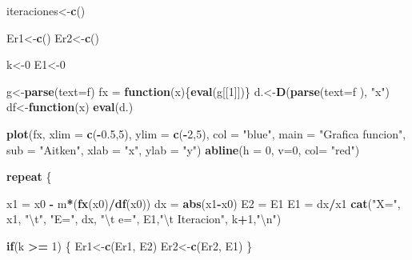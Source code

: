 \documentclass[]{article}
\newenvironment{Shaded}{\begin{snugshade}}{\end{snugshade}}
\newcommand{\CharTok}[1]{\textcolor[rgb]{0.31,0.60,0.02}{#1}}
\newcommand{\ControlFlowTok}[1]{\textcolor[rgb]{0.13,0.29,0.53}{\textbf{#1}}}
\newcommand{\DataTypeTok}[1]{\textcolor[rgb]{0.13,0.29,0.53}{#1}}
\newcommand{\DecValTok}[1]{\textcolor[rgb]{0.00,0.00,0.81}{#1}}
\newcommand{\FloatTok}[1]{\textcolor[rgb]{0.00,0.00,0.81}{#1}}
\newcommand{\KeywordTok}[1]{\textcolor[rgb]{0.13,0.29,0.53}{\textbf{#1}}}
\newcommand{\NormalTok}[1]{#1}
\newcommand{\OperatorTok}[1]{\textcolor[rgb]{0.81,0.36,0.00}{\textbf{#1}}}
\newcommand{\StringTok}[1]{\textcolor[rgb]{0.31,0.60,0.02}{#1}}
\begin{document}
\begin{Shaded}
\begin{Highlighting}[]
\NormalTok{  iteraciones<-}\KeywordTok{c}\NormalTok{()}
  
\NormalTok{  Er1<-}\KeywordTok{c}\NormalTok{()}
\NormalTok{  Er2<-}\KeywordTok{c}\NormalTok{()}
  
\NormalTok{  k<-}\DecValTok{0}
\NormalTok{  E1<-}\DecValTok{0}
  
\NormalTok{  g<-}\KeywordTok{parse}\NormalTok{(}\DataTypeTok{text=}\NormalTok{f)}
\NormalTok{  fx =}\StringTok{ }\ControlFlowTok{function}\NormalTok{(x)\{}\KeywordTok{eval}\NormalTok{(g[[}\DecValTok{1}\NormalTok{]])\}}
\NormalTok{  d.<-}\KeywordTok{D}\NormalTok{(}\KeywordTok{parse}\NormalTok{(}\DataTypeTok{text=}\NormalTok{f ), }\StringTok{"x"}\NormalTok{)}
\NormalTok{  df<-}\ControlFlowTok{function}\NormalTok{(x) }\KeywordTok{eval}\NormalTok{(d.)}
  
  \KeywordTok{plot}\NormalTok{(fx, }\DataTypeTok{xlim =} \KeywordTok{c}\NormalTok{(}\OperatorTok{-}\FloatTok{0.5}\NormalTok{,}\DecValTok{5}\NormalTok{), }\DataTypeTok{ylim =} \KeywordTok{c}\NormalTok{(}\OperatorTok{-}\DecValTok{2}\NormalTok{,}\DecValTok{5}\NormalTok{), }\DataTypeTok{col =} \StringTok{"blue"}\NormalTok{, }\DataTypeTok{main =} \StringTok{"Grafica funcion"}\NormalTok{, }\DataTypeTok{sub =} \StringTok{"Aitken"}\NormalTok{, }\DataTypeTok{xlab =} \StringTok{"x"}\NormalTok{, }\DataTypeTok{ylab =} \StringTok{"y"}\NormalTok{)}
  \KeywordTok{abline}\NormalTok{(}\DataTypeTok{h =} \DecValTok{0}\NormalTok{, }\DataTypeTok{v=}\DecValTok{0}\NormalTok{, }\DataTypeTok{col=} \StringTok{"red"}\NormalTok{)}
  
  \ControlFlowTok{repeat}
\NormalTok{  \{}
    
\NormalTok{    x1 =}\StringTok{ }\NormalTok{x0 }\OperatorTok{-}\StringTok{ }\NormalTok{m}\OperatorTok{*}\NormalTok{(}\KeywordTok{fx}\NormalTok{(x0)}\OperatorTok{/}\KeywordTok{df}\NormalTok{(x0))}
\NormalTok{    dx =}\StringTok{ }\KeywordTok{abs}\NormalTok{(x1}\OperatorTok{-}\NormalTok{x0)}
\NormalTok{    E2 =}\StringTok{ }\NormalTok{E1}
\NormalTok{    E1 =}\StringTok{ }\NormalTok{dx}\OperatorTok{/}\NormalTok{x1}
    \KeywordTok{cat}\NormalTok{(}\StringTok{"X="}\NormalTok{, x1, }\StringTok{"}\CharTok{\textbackslash{}t}\StringTok{"}\NormalTok{, }\StringTok{"E="}\NormalTok{, dx, }\StringTok{"}\CharTok{\textbackslash{}t}\StringTok{ e="}\NormalTok{, E1,}\StringTok{"}\CharTok{\textbackslash{}t}\StringTok{ Iteracion"}\NormalTok{, k}\OperatorTok{+}\DecValTok{1}\NormalTok{,}\StringTok{"}\CharTok{\textbackslash{}n}\StringTok{"}\NormalTok{)}
    
    \ControlFlowTok{if}\NormalTok{(k }\OperatorTok{>=}\StringTok{ }\DecValTok{1}\NormalTok{)}
\NormalTok{    \{}
\NormalTok{      Er1<-}\KeywordTok{c}\NormalTok{(Er1, E2)}
\NormalTok{      Er2<-}\KeywordTok{c}\NormalTok{(Er2, E1)}
\NormalTok{    \}}
    

\end{Highlighting}
\end{Shaded}
\end{document}

